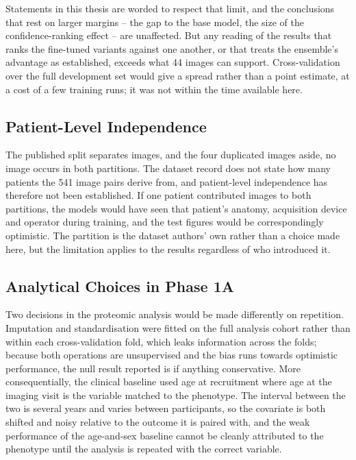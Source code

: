 Statements in this thesis are worded to respect that limit, and the conclusions that rest on
larger margins -- the gap to the base model, the size of the confidence-ranking effect -- are
unaffected. But any reading of the results that ranks the fine-tuned variants against one
another, or that treats the ensemble's advantage as established, exceeds what 44 images can
support. Cross-validation over the full development set would give a spread rather than a point
estimate, at a cost of a few training runs; it was not within the time available here.

\subsection{Patient-Level Independence}

The published split separates images, and the four duplicated images aside, no image occurs in
both partitions. The dataset record does not state how many patients the 541 image pairs derive
from, and patient-level independence has therefore not been established. If one patient
contributed images to both partitions, the models would have seen that patient's anatomy,
acquisition device and operator during training, and the test figures would be correspondingly
optimistic. The partition is the dataset authors' own rather than a choice made here, but the
limitation applies to the results regardless of who introduced it.

\subsection{Analytical Choices in Phase 1A}

Two decisions in the proteomic analysis would be made differently on repetition. Imputation and
standardisation were fitted on the full analysis cohort rather than within each cross-validation
fold, which leaks information across the folds; because both operations are unsupervised and the
bias runs towards optimistic performance, the null result reported is if anything conservative.
More consequentially, the clinical baseline used age at recruitment where age at the imaging
visit is the variable matched to the phenotype. The interval between the two is several years and
varies between participants, so the covariate is both shifted and noisy relative to the outcome
it is paired with, and the weak performance of the age-and-sex baseline cannot be cleanly
attributed to the phenotype until the analysis is repeated with the correct variable.

